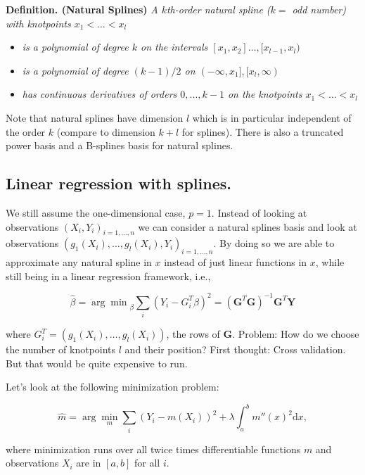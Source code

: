 \documentclass[
]{book}
\providecommand{\tightlist}{%
  \setlength{\itemsep}{0pt}\setlength{\parskip}{0pt}}
\begin{document}
\textbf{Definition. (Natural Splines)} \emph{A \(k\)th-order natural spline (\(k=\) odd number) with knotpoints \(x_1 <\dots<x_l\)}

\begin{itemize}
\tightlist
\item
  \emph{is a polynomial of degree \(k\) on the intervals \([x_1,x_2]\dots,[x_{l-1},x_l)\)}
\item
  \emph{is a polynomial of degree \((k-1)/2\) on \((-\infty,x_1],[x_l,\infty)\)}
\item
  \emph{has continuous derivatives of orders \(0,...,k-1\) on the knotpoints \(x_1 <\dots<x_l\)}
\end{itemize}

Note that natural splines have dimension \(l\) which is in particular independent of the order \(k\) (compare to dimension \(k+l\) for splines). There is also a truncated power basis and a B-splines basis for natural splines.

\hypertarget{linear-regression-with-splines.}{%
\subsection{Linear regression with splines.}\label{linear-regression-with-splines.}}

We still assume the one-dimensional case, \(p=1\). Instead of looking at observations \((X_i,Y_i)_{i=1,\dots,n}\) we can consider a natural splines basis and look at observations \((g_1(X_i), \dots, g_l(X_i), Y_i)_{i=1,\dots,n}.\) By doing so we are able to approximate any natural spline in \(x\) instead of just linear functions in \(x\), while still being in a linear regression framework, i.e.,

\[
\hat \beta = {\arg \min }_\beta \sum_i (Y_i - { G_i^T}\beta )^2= (\mathbf G^T\mathbf  G)^{-1}\mathbf  G^T\mathbf Y
\]

where \(G_i^T=(g_1(X_i), \dots, g_l(X_i))\), the rows of \(\mathbf G\). Problem: How do we choose the number of knotpoints \(l\) and their position? First thought: Cross validation. But that would be quite expensive to run.

Let's look at the following minimization problem:

\[
\hat m= \arg\min_{m} \sum_i (Y_i-m(X_i))^2+\lambda\int_a^b m''(x)^2\mathrm dx,
\]

where minimization runs over all twice times differentiable functions \(m\) and observations \(X_i\) are in \([a,b]\) for all \(i\).
\end{document}
